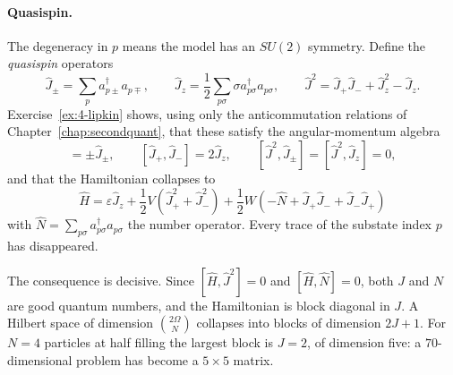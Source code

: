 \paragraph{Quasispin.}
The degeneracy in $p$ means the model has an $SU(2)$ symmetry.  Define the
\emph{quasispin} operators
\begin{equation}
  \hat{J}_{\pm} = \sum_p a_{p\pm}^{\dagger}a_{p\mp},
  \qquad
  \hat{J}_z = \frac{1}{2}\sum_{p\sigma}\sigma
    a_{p\sigma}^{\dagger}a_{p\sigma},
  \qquad
  \hat{J}^2 = \hat{J}_+\hat{J}_- + \hat{J}_z^2 - \hat{J}_z .
  \label{eq:4-quasispin}
\end{equation}
Exercise~\ref{ex:4-lipkin} shows, using only the anticommutation relations of
Chapter~\ref{chap:secondquant}, that these satisfy the angular-momentum
algebra
\begin{equation}
  [\hat{J}_z,\hat{J}_{\pm}] = \pm\hat{J}_{\pm},
  \qquad
  [\hat{J}_+,\hat{J}_-] = 2\hat{J}_z,
  \qquad
  [\hat{J}^2,\hat{J}_{\pm}] = [\hat{J}^2,\hat{J}_z] = 0,
  \label{eq:4-su2}
\end{equation}
and that the Hamiltonian collapses to
\begin{equation}
  \boxed{\;
  \hat{H} = \varepsilon\hat{J}_z
    + \frac{1}{2}V\left(\hat{J}_+^2+\hat{J}_-^2\right)
    + \frac{1}{2}W\left(-\hat{N} + \hat{J}_+\hat{J}_- + \hat{J}_-\hat{J}_+
      \right) \;}
  \label{eq:4-lipkinquasispin}
\end{equation}
with $\hat{N}=\sum_{p\sigma}a_{p\sigma}^{\dagger}a_{p\sigma}$ the number
operator.  Every trace of the substate index $p$ has disappeared.

The consequence is decisive.  Since $[\hat{H},\hat{J}^2]=0$ and
$[\hat{H},\hat{N}]=0$, both $J$ and $N$ are good quantum numbers, and the
Hamiltonian is block diagonal in $J$.  A Hilbert space of dimension
$\binom{2\Omega}{N}$ collapses into blocks of dimension $2J+1$.  For $N=4$
particles at half filling the largest block is $J=2$, of dimension five: a
$70$-dimensional problem has become a $5\times5$ matrix.

